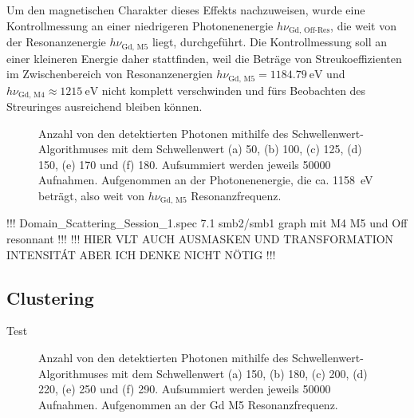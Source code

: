 \noindent
Um den magnetischen Charakter dieses Effekts nachzuweisen, wurde eine Kontrollmessung an einer niedrigeren Photonenenergie $h\nu_{\text{Gd, Off-Res}}$, die weit von der Resonanzenergie $h\nu_{\text{Gd, M5}}$ liegt, durchgeführt. Die Kontrollmessung soll an einer kleineren Energie daher stattfinden, weil die Beträge von Streukoeffizienten im Zwischenbereich von Resonanzenergien $h\nu_{\text{Gd, M5}} = \SI{1184,79}{\eV}$ und $h\nu_{\text{Gd, M4}} \approx \SI{1215}{\eV}$ nicht komplett verschwinden und fürs Beobachten des Streuringes ausreichend bleiben können.





\begin{figure}[H]
    \centering
    
    \caption{Anzahl von den detektierten Photonen mithilfe des Schwellenwert-Algorithmuses mit dem Schwellenwert (a) \SI{50}{\adu}, (b) \SI{100}{\adu}, (c) \SI{125}{\adu}, (d) \SI{150}{\adu}, (e) \SI{170}{\adu} und (f) \SI{180}{\adu}. Aufsummiert werden jeweils \num{50000} Aufnahmen. Aufgenommen an der Photonenenergie, die ca. \SI{1158}{\eV} beträgt, also weit von $h\nu_\text{Gd, M5}$ Resonanzfrequenz.}
    \label{fig:th_50_100_125_150_170_180_off_resonance}
\end{figure}
!!! Domain\_Scattering\_Session\_1.spec 7.1 smb2/smb1 graph mit M4 M5 und Off resonnant !!! 
!!! HIER VLT AUCH AUSMASKEN UND TRANSFORMATION INTENSITÁT ABER ICH DENKE NICHT NÖTIG !!!





\subsection{Clustering}
\noindent
Test
\begin{figure}[H]
    \centering
    
    \caption{Anzahl von den detektierten Photonen mithilfe des Schwellenwert-Algorithmuses mit dem Schwellenwert (a) \SI{150}{\adu}, (b) \SI{180}{\adu}, (c) \SI{200}{\adu}, (d) \SI{220}{\adu}, (e) \SI{250}{\adu} und (f) \SI{290}{\adu}. Aufsummiert werden jeweils \num{50000} Aufnahmen. Aufgenommen an der Gd M5 Resonanzfrequenz.}
    \label{fig:cl_2_0_100_125_150_170_180_resonance}
\end{figure}

